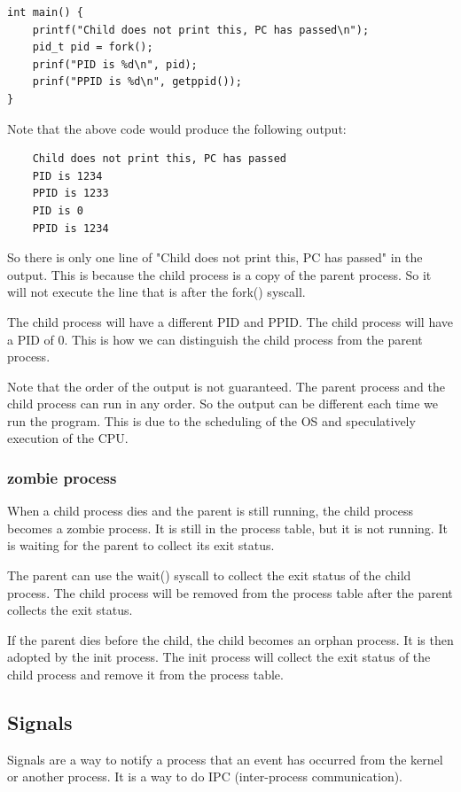 \documentclass[letterpaper,12pt]{article}
\begin{document}
\begin{lstlisting}
int main() {
    printf("Child does not print this, PC has passed\n");
    pid_t pid = fork();
    prinf("PID is %d\n", pid);
    prinf("PPID is %d\n", getppid());
}
\end{lstlisting}
Note that the above code would produce the following output:\begin{lstlisting}
    Child does not print this, PC has passed
    PID is 1234
    PPID is 1233
    PID is 0
    PPID is 1234
\end{lstlisting}
So there is only one line of "Child does not print this, PC has passed" in the
output. This is because the child process is a copy of the parent process. So
it will not execute the line that is after the fork() syscall.

The child process will have a different PID and PPID. The child process will
have a PID of 0. This is how we can distinguish the child process from the
parent process.

Note that the order of the output is not guaranteed. The parent process and the
child process can run in any order. So the output can be different each time we
run the program. This is due to the scheduling of the OS and speculatively
execution of the CPU.

\subsubsection{zombie process}
When a child process dies and the parent is still running, the child process
becomes a zombie process. It is still in the process table, but it is not
running. It is waiting for the parent to collect its exit status.

The parent can use the wait() syscall to collect the exit status of the child
process. The child process will be removed from the process table after the
parent collects the exit status.

If the parent dies before the child, the child becomes an orphan process. It is
then adopted by the init process. The init process will collect the exit status
of the child process and remove it from the process table.

\subsection{Signals}
Signals are a way to notify a process that an event has occurred from the
kernel or another process. It is a way to do IPC (inter-process communication).
\end{document}

